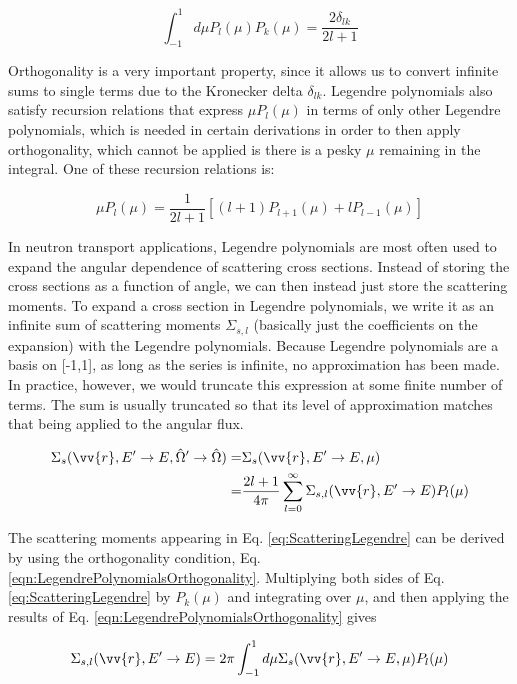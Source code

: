 \documentclass[10pt]{article}
\newcommand{\beq}{\begin{equation}}
\newcommand{\eeq}{\end{equation}}
\newcommand{\beqa}{\begin{equation}\begin{aligned}}
\newcommand{\eeqa}{\end{aligned}\end{equation}}
\newcommand{\hO}{\hat{\Omega}}
\begin{document}
\begin{flushleft}
\beq
\label{eqn:LegendrePolynomialsOrthogonality}
\int_{-1}^{1} d\mu P_l (\mu) P_k (\mu) = \frac{2\delta_{lk}}{2l+1}
\eeq

Orthogonality is a very important property, since it allows us to convert infinite sums to single terms due to the Kronecker delta \(\delta_{lk}\). Legendre polynomials also satisfy recursion relations that express \(\mu P_l(\mu)\) in terms of only other Legendre polynomials, which is needed in certain derivations in order to then apply orthogonality, which cannot be applied is there is a pesky \(\mu\) remaining in the integral. One of these recursion relations is:

\beq
\label{eqn:LegendrePolynomialRecursion1}
\mu P_l(\mu) = \frac{1}{2l+1} \left\lbrack(l+1)P_{l+1}(\mu) + l P_{l-1}(\mu)\right\rbrack
\eeq

In neutron transport applications, Legendre polynomials are most often used to expand the angular dependence of scattering cross sections. Instead of storing the cross sections as a function of angle, we can then instead just store the scattering moments. To expand a cross section in Legendre polynomials, we write it as an infinite sum of scattering moments \(\Sigma_{s,l}\) (basically just the coefficients on the expansion) with the Legendre polynomials. Because Legendre polynomials are a basis on [-1,1], as long as the series is infinite, no approximation has been made. In practice, however, we would truncate this expression at some finite number of terms. The sum is usually truncated so that its level of approximation matches that being applied to the angular flux. 

\beqa
\label{eq:ScatteringLegendre}
\Sigma_s(\vv{r}, E'\rightarrow E, \hO  '\rightarrow\hO  ) =& \Sigma_s(\vv{r}, E'\rightarrow E, \mu) \\
=& \frac{2l+1}{4\pi}\sum_{l=0}^{\infty}\Sigma_{s,l}(\vv{r}, E'\rightarrow E)P_l(\mu)\\
\eeqa

The scattering moments appearing in Eq. \ref{eq:ScatteringLegendre} can be derived by using the orthogonality condition, Eq. \ref{eqn:LegendrePolynomialsOrthogonality}. Multiplying both sides of Eq. \ref{eq:ScatteringLegendre} by \(P_k(\mu)\) and integrating over \(\mu\), and then applying the results of Eq. \ref{eqn:LegendrePolynomialsOrthogonality} gives

\beq
\label{eq:ScatteringMomentsLegendre}
\Sigma_{s,l}(\vv{r}, E'\rightarrow E) = 2\pi\int_{-1}^{1} d\mu \Sigma_s(\vv{r}, E'\rightarrow E, \mu) P_l(\mu)
\eeq


\end{flushleft}
\end{document}
